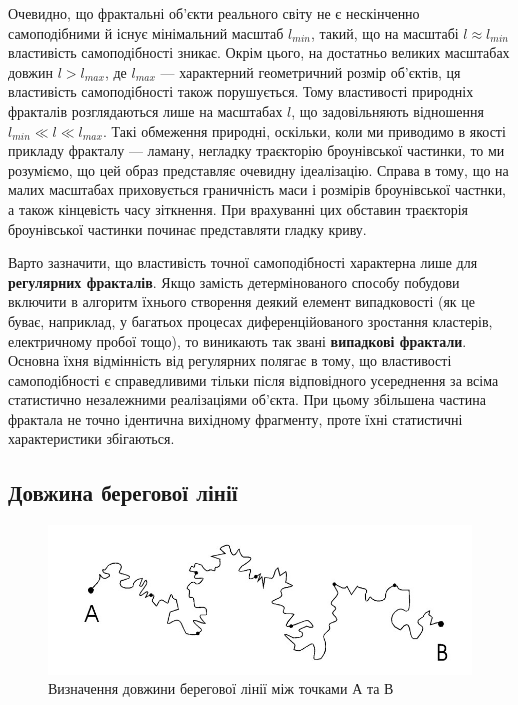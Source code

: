 \documentclass[
  letterpaper,
]{report}
\begin{document}
Очевидно, що фрактальні об'єкти реального світу не є нескінченно
самоподібними й існує мінімальний масштаб \(l_{min}\), такий, що на
масштабі \(l \approx l_{min}\) властивість самоподібності зникає. Окрім
цього, на достатньо великих масштабах довжин \(l > l_{max}\), де
\(l_{max}\) --- характерний геометричний розмір об'єктів, ця властивість
самоподібності також порушується. Тому властивості природніх фракталів
розглядаються лише на масштабах \(l\), що задовільняють відношення
\(l_{min} \ll l \ll l_{max}\). Такі обмеження природні, оскільки, коли
ми приводимо в якості прикладу фракталу --- ламану, негладку траєкторію
броунівської частинки, то ми розуміємо, що цей образ представляє
очевидну ідеалізацію. Справа в тому, що на малих масштабах приховується
граничність маси і розмірів броунівської частнки, а також кінцевість
часу зіткнення. При врахуванні цих обставин траєкторія броунівської
частинки починає представляти гладку криву.

Варто зазначити, що властивість точної самоподібності характерна лише
для \textbf{регулярних фракталів}. Якщо замість детермінованого способу
побудови включити в алгоритм їхнього створення деякий елемент
випадковості (як це буває, наприклад, у багатьох процесах
диференційованого зростання кластерів, електричному пробої тощо), то
виникають так звані \textbf{випадкові фрактали}. Основна їхня
відмінність від регулярних полягає в тому, що властивості самоподібності
є справедливими тільки після відповідного усереднення за всіма
статистично незалежними реалізаціями об'єкта. При цьому збільшена
частина фрактала не точно ідентична вихідному фрагменту, проте їхні
статистичні характеристики збігаються.

\hypertarget{ux434ux43eux432ux436ux438ux43dux430-ux431ux435ux440ux435ux433ux43eux432ux43eux457-ux43bux456ux43dux456ux457}{%
\subsection{Довжина берегової
лінії}\label{ux434ux43eux432ux436ux438ux43dux430-ux431ux435ux440ux435ux433ux43eux432ux43eux457-ux43bux456ux43dux456ux457}}

\begin{figure}

{\centering 

\includegraphics{Images/lab_6/costline.jpg}

}

\caption{\label{fig-costline}Визначення довжини берегової лінії між
точками А та В}

\end{figure}
\end{document}
